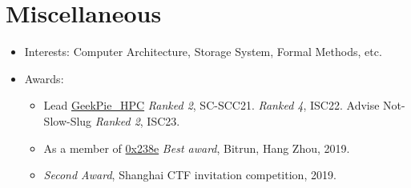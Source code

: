 \documentclass{resume}
\newcommand{\en}[1]{#1}
\newcommand{\zh}[1]{}
\begin{document}
\section{\en{Miscellaneous}\zh{其他}}
\begin{itemize}
      \item \en{Interests: Computer Architecture, Storage System, Formal Methods, etc.}
            \zh{兴趣：高性能计算、体系结构、存储、形式化验证安全等。}
      \item \en{Awards:}
      \zh{所获奖项：}
      \begin{itemize}
      \item \en{Lead \href{https://hpc.geekpie.club}{GeekPie\_HPC} \textit{Ranked 2}, SC-SCC21. \textit{Ranked 4}, ISC22. Advise Not-Slow-Slug \textit{Ranked 2}, ISC23.}
            \zh{带领\href{https://hpc.geekpie.club}{GeekPie\_HPC} SCC21 团队第2名，ISC22 团队第4名，指导 Not-Slow-Slug 团队 ISC23 团队第2名。}
      \item \en{As a member of \href{https://github.com/0x238e/Vchain}{0x238e} \textit{Best award}, Bitrun, Hang Zhou, 2019.}
            \zh{带领\href{https://github.com/0x238e/Vchain}{0x238e} Bitrun Hackathon 比赛最佳奖}
      \item \en{\textit{Second Award}, Shanghai CTF invitation competition, 2019.}
            \zh{上海2019年 CTF 邀请赛比赛二等奖}
      \end{itemize}
\end{itemize}
\end{document}
